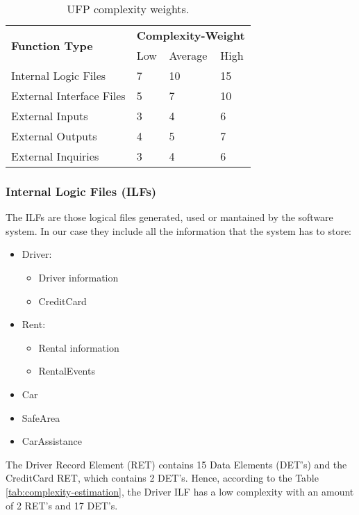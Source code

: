 \begin{table}[H]
    \centering
    \begin{tabular}{| l | l | l | l |}
        \hline
        \multirow{2}{*}{\textbf{Function Type}} & \multicolumn{3}{c|}{\textbf{Complexity-Weight}} \\
        \cline{2-4}
        & Low & Average & High \\
        \hline
        Internal Logic Files    & 7     & 10    & 15    \\
        External Interface Files & 5     & 7     & 10    \\
        External Inputs          & 3     & 4     & 6     \\
        External Outputs       & 4     & 5     & 7     \\
        External Inquiries        & 3     & 4     & 6     \\
        \hline
    \end{tabular}
    \caption{UFP complexity weights.}
    \label{tab:complexity-weights}
\end{table}

\newpage 

\subsubsection{Internal Logic Files (ILFs)}

The ILFs are those logical files generated, used or mantained by the software system. In our case they include all the information that the system has to store:
\begin{itemize}
	\item Driver:
	\begin{itemize}
		\item Driver information
		\item CreditCard
	\end{itemize}
	\item Rent:
	\begin{itemize}
		\item Rental information
		\item RentalEvents
	\end{itemize}
	\item Car
	\item SafeArea
	\item CarAssistance
\end{itemize}
The Driver Record Element (RET) contains 15 Data Elements (DET's) and the CreditCard RET, which contains 2 DET's. Hence, according to the Table \ref{tab:complexity-estimation}, the Driver ILF has a low complexity with an amount of 2 RET's and 17 DET's.

